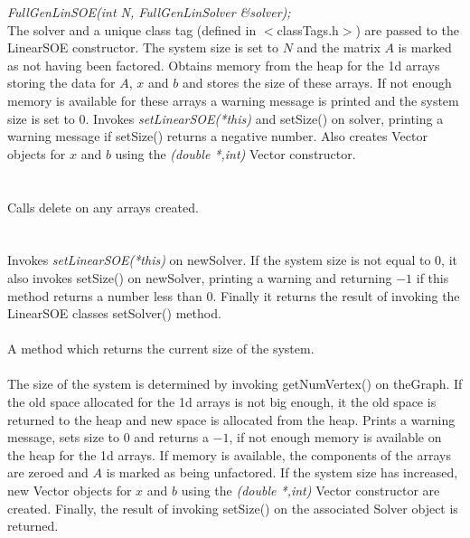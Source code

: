{\em FullGenLinSOE(int N, FullGenLinSolver \&solver); }\\
The \p solver and a unique class tag (defined in $<$classTags.h$>$)
are passed to the LinearSOE constructor. The system size is set
to $N$ and the matrix $A$ is marked as not having been
factored. Obtains memory from the heap for the 1d arrays storing the
data for $A$, $x$ and $b$ and stores the size of these arrays. If not
enough memory is available for these arrays a warning message is
printed and the system size is set to $0$. Invokes {\em
setLinearSOE(*this)} and setSize() on \p solver,
printing a warning message if setSize() returns a negative
number. Also creates Vector objects for $x$ and $b$ using the {\em
(double *,int)} Vector constructor. \\

 \\
\\ 
Calls delete on any arrays created. \\

 \\
\\
Invokes {\em setLinearSOE(*this)} on \p newSolver.
If the system size is not equal to $0$, it also invokes setSize()
on \p newSolver, printing a warning and returning $-1$ if this
method returns a number less than $0$. Finally it returns the result
of invoking the LinearSOE classes setSolver() method. \\

 \\
A method which returns the current size of the system. \\

 \\ 
The size of the system is determined by invoking getNumVertex()
on \p theGraph. If the old space allocated for the 1d arrays is not
big enough, it the old space is returned to the heap and new space is
allocated from the heap. Prints a warning message, sets size to $0$
and returns a $-1$, if not enough memory is available on the heap for the 
1d arrays. If memory is available, the components of the arrays are
zeroed and $A$ is marked as being unfactored. If the system size has
increased, new Vector objects for $x$ and $b$ using the {\em (double
*,int)} Vector constructor are created. Finally, the result of
invoking setSize() on the associated Solver object is returned. \\


